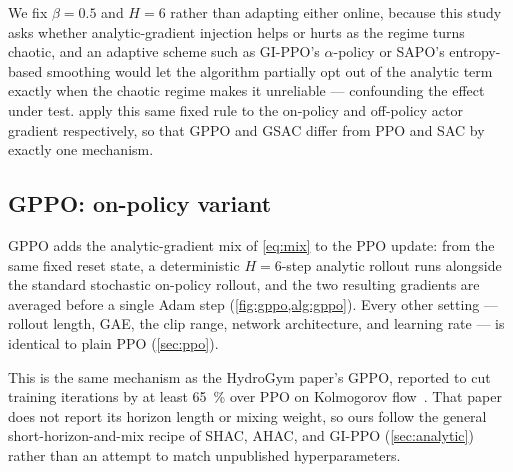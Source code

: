 We fix $\beta=0.5$ and $H=6$
rather than adapting either online, because this study asks whether
analytic-gradient injection helps or hurts as the regime turns chaotic, and
an adaptive scheme such as GI-PPO's $\alpha$-policy or SAPO's entropy-based
smoothing would let the algorithm partially opt out of the analytic term
exactly when the chaotic regime makes it unreliable --- confounding the
effect under test.  apply this same fixed rule to
the on-policy and off-policy actor gradient respectively, so that GPPO and
GSAC differ from PPO and SAC by exactly one mechanism.

\subsection{GPPO: on-policy variant}
\label{sec:gppo}

GPPO adds the analytic-gradient mix of \cref{eq:mix} to the PPO update: from
the same fixed reset state, a deterministic $H=6$-step analytic rollout runs
alongside the standard stochastic on-policy rollout, and the two resulting
gradients are averaged before a single Adam step (\cref{fig:gppo,alg:gppo}).
Every other setting --- rollout length, GAE, the clip range, network
architecture, and learning rate --- is identical to plain PPO (\cref{sec:ppo}).

This is the same mechanism as the HydroGym paper's GPPO, reported to cut
training iterations by at least \SI{65}{\percent} over PPO on Kolmogorov
flow~\cite{hydrogym2026}. That paper does not report its horizon length or
mixing weight, so ours follow the general short-horizon-and-mix recipe of
SHAC, AHAC, and GI-PPO (\cref{sec:analytic}) rather than an attempt to match
unpublished hyperparameters.

